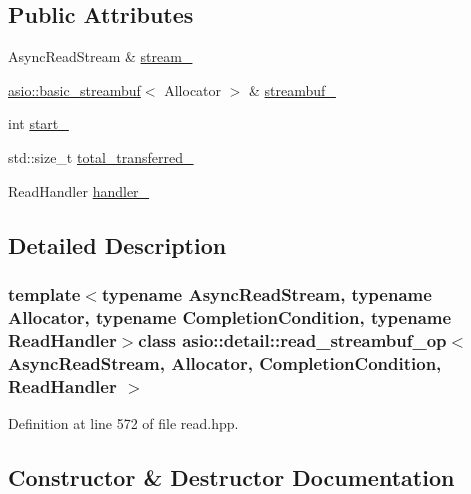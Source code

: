 \subsection*{Public Attributes}
\begin{DoxyCompactItemize}
\item 
Async\+Read\+Stream \& \hyperlink{classasio_1_1detail_1_1read__streambuf__op_ae6b7af6cf5d34d6d6ad76b3840a3d786}{stream\+\_\+}
\item 
\hyperlink{classasio_1_1basic__streambuf}{asio\+::basic\+\_\+streambuf}$<$ Allocator $>$ \& \hyperlink{classasio_1_1detail_1_1read__streambuf__op_a254bfb01270d44ceaa9066e7a59c514e}{streambuf\+\_\+}
\item 
int \hyperlink{classasio_1_1detail_1_1read__streambuf__op_ad2fce322315f6b21047377f675e22cc7}{start\+\_\+}
\item 
std\+::size\+\_\+t \hyperlink{classasio_1_1detail_1_1read__streambuf__op_acfdc20ee2c0a53125cfda4269d23380b}{total\+\_\+transferred\+\_\+}
\item 
Read\+Handler \hyperlink{classasio_1_1detail_1_1read__streambuf__op_a13df8eb74bfc425dbe35bf9b5b3ee34c}{handler\+\_\+}
\end{DoxyCompactItemize}


\subsection{Detailed Description}
\subsubsection*{template$<$typename Async\+Read\+Stream, typename Allocator, typename Completion\+Condition, typename Read\+Handler$>$class asio\+::detail\+::read\+\_\+streambuf\+\_\+op$<$ Async\+Read\+Stream, Allocator, Completion\+Condition, Read\+Handler $>$}



Definition at line 572 of file read.\+hpp.



\subsection{Constructor \& Destructor Documentation}
\hypertarget{classasio_1_1detail_1_1read__streambuf__op_a63025076e85f597c0fe17b76a23d66c2}{}
